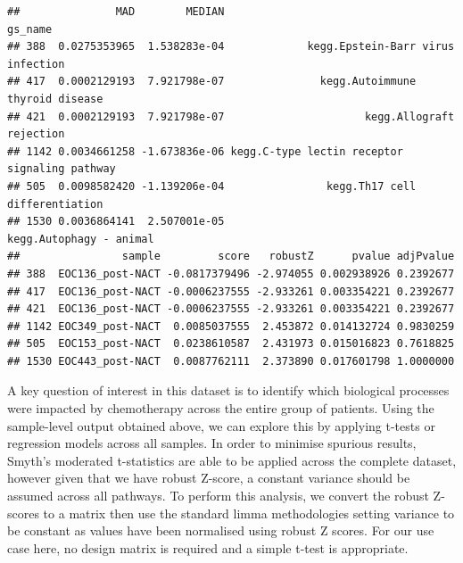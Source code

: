 \documentclass[9pt,a4paper,]{extarticle}
\begin{document}
\begin{verbatim}
##               MAD        MEDIAN                                       gs_name
## 388  0.0275353965  1.538283e-04             kegg.Epstein-Barr virus infection
## 417  0.0002129193  7.921798e-07               kegg.Autoimmune thyroid disease
## 421  0.0002129193  7.921798e-07                      kegg.Allograft rejection
## 1142 0.0034661258 -1.673836e-06 kegg.C-type lectin receptor signaling pathway
## 505  0.0098582420 -1.139206e-04                kegg.Th17 cell differentiation
## 1530 0.0036864141  2.507001e-05                       kegg.Autophagy - animal
##                sample         score   robustZ      pvalue adjPvalue
## 388  EOC136_post-NACT -0.0817379496 -2.974055 0.002938926 0.2392677
## 417  EOC136_post-NACT -0.0006237555 -2.933261 0.003354221 0.2392677
## 421  EOC136_post-NACT -0.0006237555 -2.933261 0.003354221 0.2392677
## 1142 EOC349_post-NACT  0.0085037555  2.453872 0.014132724 0.9830259
## 505  EOC153_post-NACT  0.0238610587  2.431973 0.015016823 0.7618825
## 1530 EOC443_post-NACT  0.0087762111  2.373890 0.017601798 1.0000000
\end{verbatim}

A key question of interest in this dataset is to identify which biological processes were impacted by chemotherapy across the entire group of patients.
Using the sample-level output obtained above, we can explore this by applying t-tests or regression models across all samples.
In order to minimise spurious results, Smyth's moderated t-statistics\citep{Smyth_2004} are able to be applied across the complete dataset, however given that we have robust Z-score, a constant variance should be assumed across all pathways.
To perform this analysis, we convert the robust Z-scores to a matrix then use the standard limma methodologies setting variance to be constant as values have been normalised using robust Z scores.
For our use case here, no design matrix is required and a simple t-test is appropriate.
\end{document}
